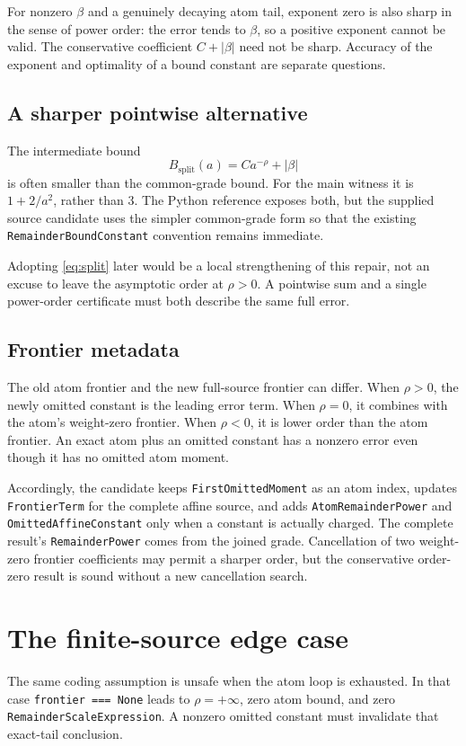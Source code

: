 \documentclass[11pt,letterpaper]{article}
\newcommand{\code}[1]{\nolinkurl{#1}}
\begin{document}
For nonzero $\beta$ and a genuinely decaying atom tail, exponent zero is also
sharp in the sense of power order: the error tends to $\beta$, so a positive
exponent cannot be valid. The conservative coefficient $C+|\beta|$ need not
be sharp. Accuracy of the exponent and optimality of a bound constant are
separate questions.

\subsection{A sharper pointwise alternative}
The intermediate bound
\begin{equation}\label{eq:split}
 B_{\mathrm{split}}(a)=Ca^{-\rho}+|\beta|
\end{equation}
is often smaller than the common-grade bound. For the main witness it is
$1+2/a^2$, rather than $3$. The Python reference exposes both, but the supplied
source candidate uses the simpler common-grade form so that the existing
\code{RemainderBoundConstant} convention remains immediate.

Adopting \eqref{eq:split} later would be a local strengthening of this repair,
not an excuse to leave the asymptotic order at $\rho>0$. A pointwise sum and a
single power-order certificate must both describe the same full error.

\subsection{Frontier metadata}
The old atom frontier and the new full-source frontier can differ. When
$\rho>0$, the newly omitted constant is the leading error term. When $\rho=0$,
it combines with the atom's weight-zero frontier. When $\rho<0$, it is lower
order than the atom frontier. An exact atom plus an omitted constant has a
nonzero error even though it has no omitted atom moment.

Accordingly, the candidate keeps \code{FirstOmittedMoment} as an atom index,
updates \code{FrontierTerm} for the complete affine source, and adds
\code{AtomRemainderPower} and \code{OmittedAffineConstant} only when a constant
is actually charged. The complete result's \code{RemainderPower} comes from the
joined grade. Cancellation of two weight-zero frontier coefficients may permit
a sharper order, but the conservative order-zero result is sound without a
new cancellation search.

\section{The finite-source edge case}
The same coding assumption is unsafe when the atom loop is exhausted. In that
case \code{frontier === None} leads to $\rho=+\infty$, zero atom bound, and zero
\code{RemainderScaleExpression}. A nonzero omitted constant must invalidate
that exact-tail conclusion.
\end{document}
